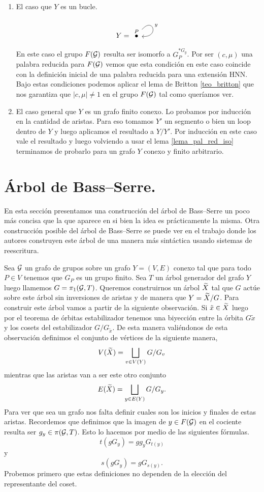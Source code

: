 \documentclass[tesis.tex]{subfiles}
\begin{document}
\begin{enumerate}
		\item El caso que $Y$ es un bucle.
		\[
		Y = 	\begin{tikzcd}
			\overset{P}{\bullet} \arrow["y", loop, distance=2.5em, in=355, out=50]
		\end{tikzcd}
		\]
		
		En este caso el grupo $F({\cal G})$ resulta ser isomorfo a $G_P^{\ast G_y}$.
		Por ser $(c, \mu)$ una palabra reducida para $F({\cal G})$ vemos que esta condición en este caso coincide con la definición inicial de una palabra reducida para una extensión HNN.		
		Bajo estas condiciones podemos aplicar el lema de Britton \ref{teo_britton} que nos garantiza que $|c, \mu| \neq 1$ en el grupo $F({\cal G})$ tal como queríamos ver.
		
		\item El caso general que $Y$ es un grafo finito conexo.
		Lo probamos por inducción en la cantidad de aristas. 
		Para eso tomamos $Y'$ un segmento o bien un loop dentro de $Y$ y luego aplicamos el resultado a $Y/Y'$.
		Por inducción en este caso vale el resultado y luego volviendo a usar el lema \ref{lema_pal_red_iso} terminamos de probarlo para un grafo $Y$ conexo y finito arbitrario.
	\end{enumerate}


\section{Árbol de Bass--Serre.}\label{secc_arb_BS}
En esta sección presentamos una construcción del árbol de Bass--Serre un poco más concisa que la que aparece en \cite{serre2002trees} si bien la idea es prácticamente la misma.
Otra construcción posible del árbol de Bass--Serre se puede ver en el trabajo \cite{diekert2017context} donde los autores construyen este árbol de una manera más sintáctica usando sistemas de reescritura.

Sea ${\cal G}$ un grafo de grupos sobre un grafo $Y = (V,E)$ conexo tal que para todo $P \in V$ tenemos que $G_{P}$ es un grupo finito. 
Sea $T$ un árbol generador del grafo $Y$ luego llamemos $G = \pi_1({\cal G},T)$.
Queremos construirnos un árbol $\widetilde X$ tal que $G$ actúe sobre este árbol sin inversiones de aristas y de manera que $Y = \widetilde X / G$.
Para construir este árbol vamos a partir de la siguiente observación.
Si $\tilde x \in \widetilde X$ luego por el teorema de órbitas estabilizador tenemos una biyección entre la órbita $G \tilde x $ y los cosets del estabilizador $G / G_{\tilde x}$.
De esta manera valiéndonos de esta observación definimos el conjunto de vértices de la siguiente manera,
\[
V(\widetilde X) = \bigsqcup_{v \in V(Y)} G/G_{v}
\]
mientras que las aristas van a ser este otro conjunto
\[
E(\widetilde X) = \bigsqcup_{y \in E(Y)} G/G_{y}.
\]
Para ver que sea un grafo nos falta definir cuales son los inicios y finales de estas aristas.
Recordemos que definimos que la imagen de $y \in F({\cal G})$ en el cociente resulta ser $g_{y} \in \pi({\cal G},T)$. 
Esto lo hacemos por medio de las siguientes fórmulas.
\[
t(gG_{y}) = gg_{y}G_{t(y)}
\]
y 
\[
s(gG_{y}) = gG_{s(y)}.
\]
Probemos primero que estas definiciones no dependen de la elección del representante del coset.
\end{document}
